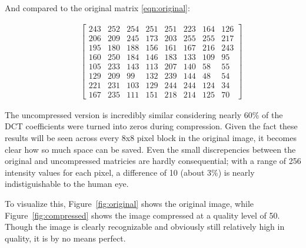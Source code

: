 \documentclass[11pt]{article}
\begin{document}
And compared to the original matrix \eqref{eqn:original}:

\begin{align*}
  \qquad\begin{bmatrix}
    243 & 252 & 254 & 251 & 251 & 223 & 164 & 126 \\
    206 & 209 & 245 & 173 & 203 & 255 & 255 & 217 \\
    195 & 180 & 188 & 156 & 161 & 167 & 216 & 243 \\
    160 & 250 & 184 & 146 & 183 & 133 & 109 &  95 \\
    105 & 233 & 143 & 113 & 207 & 140 &  58 &  55 \\
    129 & 209 &  99 & 132 & 239 & 144 &  48 &  54 \\
    221 & 231 & 103 & 129 & 244 & 244 & 124 &  34 \\
    167 & 235 & 111 & 151 & 218 & 214 & 125 &  70
  \end{bmatrix}
\end{align*}

The uncompressed version is incredibly similar considering nearly 60\% of the DCT coefficients were turned into zeros during compression.
Given the fact these results will be seen across every 8x8 pixel block in the original image, it becomes clear how so much space can be saved.
Even the small discrepencies between the original and uncompressed matricies are hardly consequential; with a range of 256 intensity values for each pixel, a difference of 10 (about 3\%) is nearly indistiguishable to the human eye.

To visualize this, Figure~\ref{fig:original} shows the original image, while Figure~\ref{fig:compressed} shows the image compressed at a quality level of 50.
Though the image is clearly recognizable and obviously still relatively high in quality, it is by no means perfect.
\end{document}
